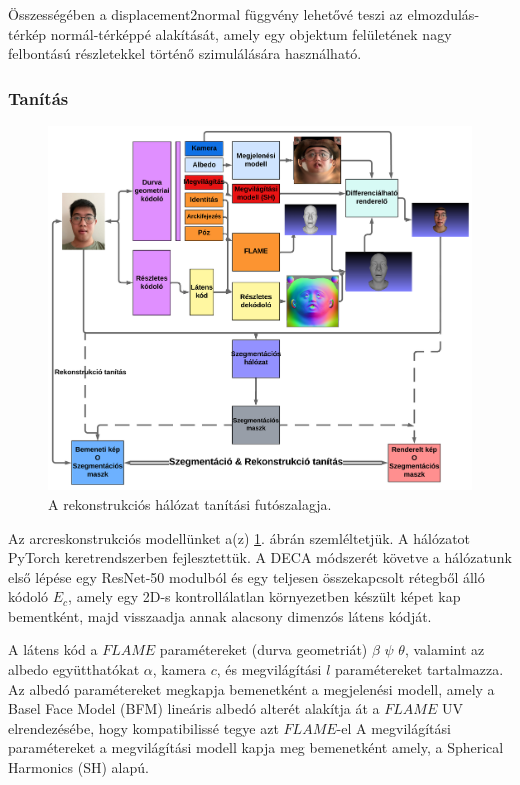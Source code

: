 \documentclass[12pt,a4]{article}
\begin{document}
Összességében a displacement2normal függvény lehetővé teszi az elmozdulás-térkép normál-térképpé alakítását, amely egy objektum felületének nagy felbontású részletekkel történő szimulálására használható.

\subsubsection{Tanítás}
    \begin{figure}[h]	
		\centering
		\includegraphics[width=1\linewidth]{pipelinehun}
		\caption{  A rekonstrukciós hálózat tanítási futószalagja.}
        \label{fig:pipeline}
	\end{figure}
 
	Az arcreskonstrukciós modellünket a(z) \ref{fig:pipeline}. ábrán szemléltetjük. A hálózatot PyTorch
	keretrendszerben fejlesztettük.
	A DECA módszerét követve a hálózatunk első lépése egy
	ResNet-50 modulból és egy teljesen összekapcsolt rétegből álló kódoló
	$E_{c}$, amely egy 2D-s kontrollálatlan környezetben készült képet kap bementként, majd visszaadja annak alacsony dimenzós látens kódját.
 
 A látens kód a $FLAME$
	paramétereket (durva geometriát) $\beta$ $\psi$ $\theta$, valamint az albedo együtthatókat
	$\alpha$, kamera $c$, és megvilágítási $l$ paramétereket tartalmazza.
	Az albedó paramétereket megkapja
	bemenetként a megjelenési modell, amely a Basel Face Model (BFM)
	lineáris albedó alterét alakítja át a $FLAME$ UV elrendezésébe,
	hogy kompatibilissé tegye azt $FLAME$-el A megvilágítási paramétereket
	a megvilágítási modell kapja meg bemenetként amely,
	a Spherical Harmonics (SH) alapú.
 
\end{document}
